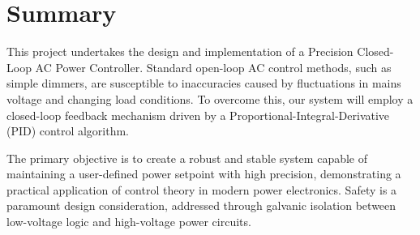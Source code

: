 \documentclass[12pt]{article}
\begin{document}
\section{Summary}
This project undertakes the design and implementation of a Precision Closed-Loop AC Power Controller. Standard open-loop AC control methods, such as simple dimmers, are susceptible to inaccuracies caused by fluctuations in mains voltage and changing load conditions. To overcome this, our system will employ a closed-loop feedback mechanism driven by a Proportional-Integral-Derivative (PID) control algorithm.

The primary objective is to create a robust and stable system capable of maintaining a user-defined power setpoint with high precision, demonstrating a practical application of control theory in modern power electronics. Safety is a paramount design consideration, addressed through galvanic isolation between low-voltage logic and high-voltage power circuits.
\end{document}
